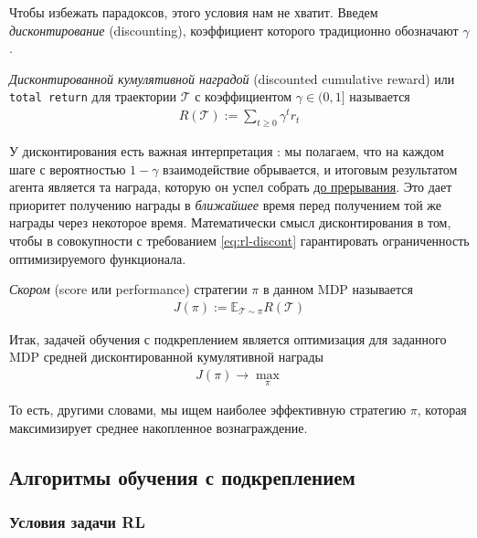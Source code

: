 \documentclass[%
	11pt,
	a4paper,
	utf8,
		]{article}
\begin{document}
Чтобы избежать парадоксов, этого условия нам не хватит. Введем \emph{дисконтирование} (discounting), коэффициент которого традиционно обозначают $ \gamma $.

\emph{Дисконтированной кумулятивной наградой} (discounted cumulative reward) или \texttt{total return} для траектории $ \mathcal{T} $ с коэффициентом $ \gamma \in (0, 1] $ называется
\begin{align*}
	R(\mathcal{T}) := \sum_{t \geqslant 0} \gamma^t r_t
\end{align*}

У дисконтирования есть важная интерпретация \cite[]{ivanov:rl-2022}: мы полагаем, что на каждом шаге с вероятностью $ 1 - \gamma $ взаимодействие обрывается, и итоговым результатом агента является та награда, которую он успел собрать \underline{до прерывания}. Это дает приоритет получению награды в \emph{ближайшее} время перед получением той же награды через некоторое время. Математически смысл дисконтирования в том, чтобы в совокупности с требованием \eqref{eq:rl-discont} гарантировать ограниченность оптимизируемого функционала.

\emph{Скором} (score  или performance) стратегии $ \pi $ в данном MDP называется \cite[]{ivanov:rl-2022} 
\begin{align*}
	J(\pi) := \mathbb{E}_{\mathcal{T} \sim \pi} R(\mathcal{T})
\end{align*}

Итак, задачей обучения с подкреплением является оптимизация для заданного MDP средней дисконтированной кумулятивной награды
\begin{align*}
	J(\pi) \rightarrow \underset{\pi}{\max}
\end{align*}

То есть, другими словами, мы ищем наиболее эффективную стратегию $ \pi $, которая максимизирует среднее накопленное вознаграждение.

\subsection{Алгоритмы обучения с подкреплением}

\subsubsection{Условия задачи RL}
\end{document}
